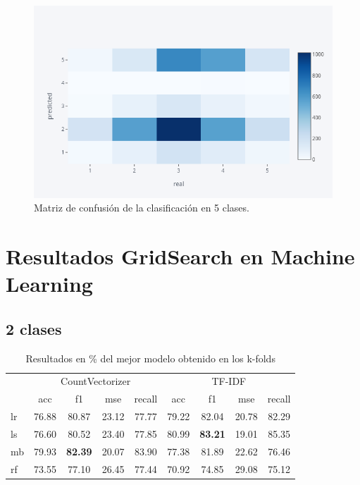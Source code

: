 \begin{figure}[H]
	\centering
	\includegraphics[width=1\textwidth]{imaxes/heatmap.png}
	\caption{Matriz de confusión de la clasificación en 5 clases.}
	\label{conf5clases}
\end{figure}


\section{Resultados GridSearch en Machine Learning}

\subsection{2 clases}

\begin{table}[H]
	\centering
	\begin{tabular}{|l|cccc|cccc|}
		\hline
		& \multicolumn{4}{c|}{CountVectorizer} & \multicolumn{4}{c|}{TF-IDF} \\
		\cline{2-9}
		&    acc &     f1 &    mse &  recall & acc &     f1 &    mse &  recall \\
		\hline
		lr      &  76.88 &  80.87 &  23.12 &   77.77 &  79.22 &  82.04 &  20.78 &   82.29 \\
		ls      &  76.60 &  80.52 &  23.40 &   77.85 &  80.99 &  \textbf{83.21} &  19.01 &   85.35 \\
		mb      &  79.93 &  \textbf{82.39} &  20.07 &   83.90 &  77.38 &  81.89 &  22.62 &   76.46 \\
		rf      &  73.55 &  77.10 &  26.45 &   77.44 &  70.92 &  74.85 &  29.08 &   75.12 \\
		\hline
	\end{tabular}
	\caption{Resultados en \% del mejor modelo obtenido en los k-folds}
	\label{result-cv-test}
\end{table}

